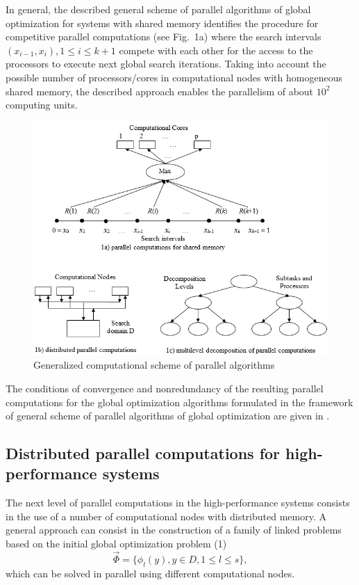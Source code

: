 \documentclass[12pt]{amsart}
\begin{document}
In general, the described general scheme of parallel algorithms of global optimization for systems with shared memory identifies the procedure for competitive parallel computations (see Fig.~1a) where the search intervals $(x_{i-1} ,x_i), 1 \leq i \leq k + 1$ compete with each other for the access to the processors to execute next global search iterations. Taking into account the possible number of processors/cores in computational nodes with homogeneous shared memory, the described approach enables the parallelism of about $10^2$ computing units.

\begin{figure}[t]
\centering
\includegraphics[width=13.0cm]{Fig1}
\caption{Generalized computational scheme of parallel algorithms}
\label{fig:Fig1}
\end{figure}

The conditions of convergence and nonredundancy of the resulting parallel computations for the global optimization algorithms formulated in the framework of general scheme of parallel algorithms of global optimization are given in \cite{Strongin1, Strongin2, Strongin4, Grishagin2}.


\subsection{Distributed parallel computations for high-performance systems}

The next level of parallel computations in the high-performance systems consists in the use of a number of computational nodes with distributed memory. A general approach can consist in the construction of a family of linked problems based on the initial global optimization problem (1)
\begin{equation}
\overrightarrow{\Phi} = \{ \phi_l(y), y \in D, 1 \leq l \leq s \},
\end{equation}
which can be solved in parallel using different computational nodes.
\end{document}
